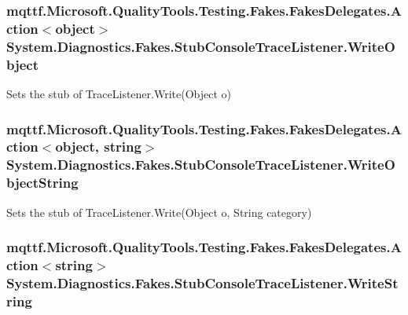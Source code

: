 \hypertarget{class_system_1_1_diagnostics_1_1_fakes_1_1_stub_console_trace_listener_a44e3e474f23585a57b0cc1c1a6db0a92}{
\subsubsection[{Write\-Object}]{\setlength{\rightskip}{0pt plus 5cm}mqttf.\-Microsoft.\-Quality\-Tools.\-Testing.\-Fakes.\-Fakes\-Delegates.\-Action$<$object$>$ System.\-Diagnostics.\-Fakes.\-Stub\-Console\-Trace\-Listener.\-Write\-Object}}\label{class_system_1_1_diagnostics_1_1_fakes_1_1_stub_console_trace_listener_a44e3e474f23585a57b0cc1c1a6db0a92}


Sets the stub of Trace\-Listener.\-Write(\-Object o)

\hypertarget{class_system_1_1_diagnostics_1_1_fakes_1_1_stub_console_trace_listener_a09eed87eacb12cc42b1e7ca6fd3abc4c}{
\subsubsection[{Write\-Object\-String}]{\setlength{\rightskip}{0pt plus 5cm}mqttf.\-Microsoft.\-Quality\-Tools.\-Testing.\-Fakes.\-Fakes\-Delegates.\-Action$<$object, string$>$ System.\-Diagnostics.\-Fakes.\-Stub\-Console\-Trace\-Listener.\-Write\-Object\-String}}\label{class_system_1_1_diagnostics_1_1_fakes_1_1_stub_console_trace_listener_a09eed87eacb12cc42b1e7ca6fd3abc4c}


Sets the stub of Trace\-Listener.\-Write(\-Object o, String category)

\hypertarget{class_system_1_1_diagnostics_1_1_fakes_1_1_stub_console_trace_listener_a3664fe514ef43976960e32dd48a53788}{
\subsubsection[{Write\-String}]{\setlength{\rightskip}{0pt plus 5cm}mqttf.\-Microsoft.\-Quality\-Tools.\-Testing.\-Fakes.\-Fakes\-Delegates.\-Action$<$string$>$ System.\-Diagnostics.\-Fakes.\-Stub\-Console\-Trace\-Listener.\-Write\-String}}\label{class_system_1_1_diagnostics_1_1_fakes_1_1_stub_console_trace_listener_a3664fe514ef43976960e32dd48a53788}


